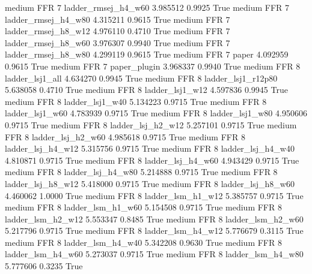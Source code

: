     medium      FFR                 7    ladder_rmsej_h4_w60   3.985512      0.9925    True
    medium      FFR                 7    ladder_rmsej_h4_w80   4.315211      0.9615    True
    medium      FFR                 7    ladder_rmsej_h8_w12   4.976110      0.4710    True
    medium      FFR                 7    ladder_rmsej_h8_w60   3.976307      0.9940    True
    medium      FFR                 7    ladder_rmsej_h8_w80   4.299119      0.9615    True
    medium      FFR                 7                  paper   4.092959      0.9615    True
    medium      FFR                 7           paper_plugin   3.968337      0.9940    True
    medium      FFR                 8        ladder_lsj1_all   4.634270      0.9945    True
    medium      FFR                 8     ladder_lsj1_r12p80   5.638058      0.4710    True
    medium      FFR                 8        ladder_lsj1_w12   4.597836      0.9945    True
    medium      FFR                 8        ladder_lsj1_w40   5.134223      0.9715    True
    medium      FFR                 8        ladder_lsj1_w60   4.783939      0.9715    True
    medium      FFR                 8        ladder_lsj1_w80   4.950606      0.9715    True
    medium      FFR                 8      ladder_lsj_h2_w12   5.257101      0.9715    True
    medium      FFR                 8      ladder_lsj_h2_w60   4.985618      0.9715    True
    medium      FFR                 8      ladder_lsj_h4_w12   5.315756      0.9715    True
    medium      FFR                 8      ladder_lsj_h4_w40   4.810871      0.9715    True
    medium      FFR                 8      ladder_lsj_h4_w60   4.943429      0.9715    True
    medium      FFR                 8      ladder_lsj_h4_w80   5.214888      0.9715    True
    medium      FFR                 8      ladder_lsj_h8_w12   5.418000      0.9715    True
    medium      FFR                 8      ladder_lsj_h8_w60   4.460062      1.0000    True
    medium      FFR                 8      ladder_lsm_h1_w12   5.385757      0.9715    True
    medium      FFR                 8      ladder_lsm_h1_w60   5.154508      0.9715    True
    medium      FFR                 8      ladder_lsm_h2_w12   5.553347      0.8485    True
    medium      FFR                 8      ladder_lsm_h2_w60   5.217796      0.9715    True
    medium      FFR                 8      ladder_lsm_h4_w12   5.776679      0.3115    True
    medium      FFR                 8      ladder_lsm_h4_w40   5.342208      0.9630    True
    medium      FFR                 8      ladder_lsm_h4_w60   5.273037      0.9715    True
    medium      FFR                 8      ladder_lsm_h4_w80   5.777606      0.3235    True

